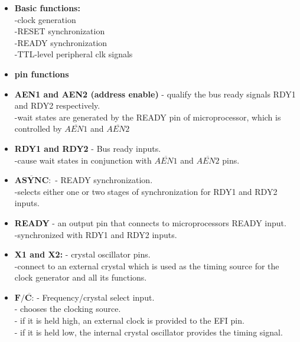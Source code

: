 \documentclass[12pt]{article}
\begin{document}
\begin{itemize}
	\item \textbf{Basic functions:}\\
	-clock generation\\
	-RESET synchronization\\
	-READY synchronization\\
	-TTL-level peripheral clk signals\\
	
	\item\textbf{pin functions}\\
	
	\item\textbf{AEN1 and AEN2 (address enable)} - qualify the bus ready signals RDY1 and RDY2 respectively.\\
	-wait states are generated by the READY pin of microprocessor, which is controlled by $\overline{AEN1}$ and $\overline{AEN2}$
	
	\item\textbf{RDY1 and RDY2} - Bus ready inputs.\\
	-cause wait states in conjunction with $\overline{AEN1}$ and $\overline{AEN2}$ pins.\\
	
	\item$\overline{\textbf{ASYNC}}:$ - READY synchronization.\\
	-selects either one or two stages of synchronization for RDY1 and RDY2 inputs.\\
	
	\item\textbf{READY} - an output pin that connects to microprocessors READY input.\\
	-synchronized with RDY1 and RDY2 inputs.\\
	
	\item \textbf{X1 and X2:} - crystal oscillator pins.\\
	-connect to an external crystal which is used as the timing source for the clock generator and all its functions.\\
	
	\item $\textbf{F/}\overline{\textbf{C:}}$ - Frequency/crystal select input.\\
	- chooses the clocking source.\\
	- if it is held high, an external clock is provided to the EFI pin.\\
	- if it is held low, the internal crystal oscillator provides the timing signal.\\
	

\end{itemize}
\end{document}
